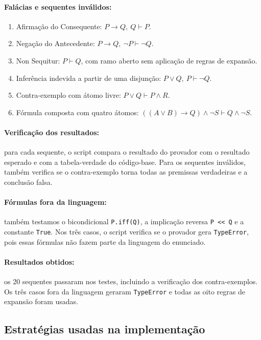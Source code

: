 \documentclass[12pt,a4paper]{article}
\begin{document}
\paragraph{Falácias e sequentes inválidos:}
\begin{enumerate}
    \item Afirmação do Consequente: $P \rightarrow Q,\ Q \vdash P$.
    \item Negação do Antecedente: $P \rightarrow Q,\ \neg P \vdash \neg Q$.
    \item Non Sequitur: $P \vdash Q$, com ramo aberto sem aplicação de regras de expansão.
    \item Inferência indevida a partir de uma disjunção: $P \vee Q,\ P \vdash \neg Q$.
    \item Contra-exemplo com átomo livre: $P \vee Q \vdash P \wedge R$.
    \item Fórmula composta com quatro átomos:
    $((A \vee B) \rightarrow Q) \wedge \neg S \vdash Q \wedge \neg S$.
\end{enumerate}

\paragraph{Verificação dos resultados:} para cada sequente, o script compara o resultado do provador com o resultado esperado e com a tabela-verdade do código-base. Para os sequentes inválidos, também verifica se o contra-exemplo torna todas as premissas verdadeiras e a conclusão falsa.

\paragraph{Fórmulas fora da linguagem:} também testamos o bicondicional \texttt{P.iff(Q)}, a implicação reversa \texttt{P << Q} e a constante \texttt{True}. Nos três casos, o script verifica se o provador gera \texttt{TypeError}, pois essas fórmulas não fazem parte da linguagem do enunciado.

\paragraph{Resultados obtidos:} os 20 sequentes passaram nos testes, incluindo a verificação dos contra-exemplos. Os três casos fora da linguagem geraram \texttt{TypeError} e todas as oito regras de expansão foram usadas.

\subsection{Estratégias usadas na implementação}
\end{document}
